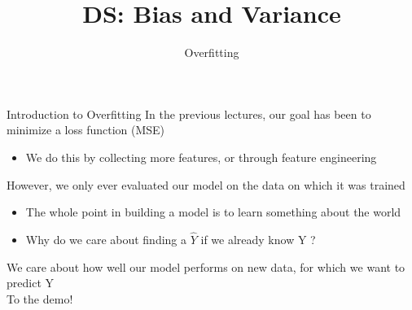 \documentclass[aspectratio=169]{../latex_main/tntbeamer}  %
\title[Introduction]{DS: Bias and Variance}
\subtitle{Overfitting}
\begin{document}
	
	\maketitle
	\begin{frame}{Introduction to Overfitting}
	    In the previous lectures, our goal has been to minimize a loss function (MSE)
	    \begin{itemize}
	        \item We do this by collecting more features, or through feature engineering
	    \end{itemize}
	    \bigskip
	    However, we only ever evaluated our model on the data on which it was trained
	    \begin{itemize}
	        \item The whole point in building a model is to learn something about the world
	        \item Why do we care about finding a   $\hat{Y}$   if we already know   Y  ?
	    \end{itemize}
	    \bigskip
	    We care about how well our model performs on new data, for which we want to predict Y\\
	    \bigskip
	    To the demo!
	\end{frame}
	
	
\end{document}
